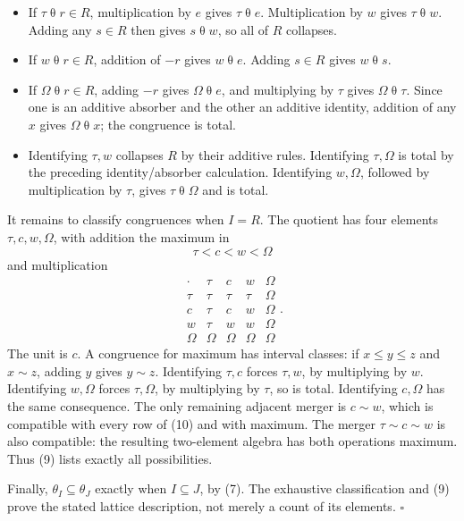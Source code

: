 \documentclass[
]{article}
\providecommand{\tightlist}{%
  \setlength{\itemsep}{0pt}\setlength{\parskip}{0pt}}
\begin{document}
\begin{itemize}
\tightlist
\item
  If \(\tau\mathrel\theta r\in R\), multiplication by \(e\) gives
  \(\tau\mathrel\theta e\). Multiplication by \(w\) gives
  \(\tau\mathrel\theta w\). Adding any \(s\in R\) then gives
  \(s\mathrel\theta w\), so all of \(R\) collapses.
\item
  If \(w\mathrel\theta r\in R\), addition of \(-r\) gives
  \(w\mathrel\theta e\). Adding \(s\in R\) gives \(w\mathrel\theta s\).
\item
  If \(\Omega\mathrel\theta r\in R\), adding \(-r\) gives
  \(\Omega\mathrel\theta e\), and multiplying by \(\tau\) gives
  \(\Omega\mathrel\theta\tau\). Since one is an additive absorber and
  the other an additive identity, addition of any \(x\) gives
  \(\Omega\mathrel\theta x\); the congruence is total.
\item
  Identifying \(\tau,w\) collapses \(R\) by their additive rules.
  Identifying \(\tau,\Omega\) is total by the preceding
  identity/absorber calculation. Identifying \(w,\Omega\), followed by
  multiplication by \(\tau\), gives \(\tau\mathrel\theta\Omega\) and is
  total.
\end{itemize}

It remains to classify congruences when \(I=R\). The quotient has four
elements \(\tau,c,w,\Omega\), with addition the maximum in \[
\tau<c<w<\Omega
\] and multiplication \[
\begin{array}{c|cccc}
\cdot&\tau&c&w&\Omega\\\hline
\tau&\tau&\tau&\tau&\Omega\\
c&\tau&c&w&\Omega\\
w&\tau&w&w&\Omega\\
\Omega&\Omega&\Omega&\Omega&\Omega
\end{array}.
\tag{10}
\] The unit is \(c\). A congruence for maximum has interval classes: if
\(x\le y\le z\) and \(x\sim z\), adding \(y\) gives \(y\sim z\).
Identifying \(\tau,c\) forces \(\tau,w\), by multiplying by \(w\).
Identifying \(w,\Omega\) forces \(\tau,\Omega\), by multiplying by
\(\tau\), so is total. Identifying \(c,\Omega\) has the same
consequence. The only remaining adjacent merger is \(c\sim w\), which is
compatible with every row of (10) and with maximum. The merger
\(\tau\sim c\sim w\) is also compatible: the resulting two-element
algebra has both operations maximum. Thus (9) lists exactly all
possibilities.

Finally, \(\theta_I\subseteq\theta_J\) exactly when \(I\subseteq J\), by
(7). The exhaustive classification and (9) prove the stated lattice
description, not merely a count of its elements. \(\square\)
\end{document}
